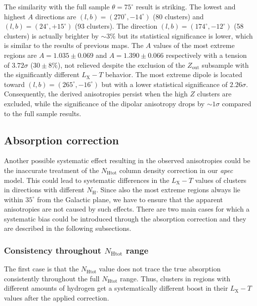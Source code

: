 \documentclass{aa}   %
\begin{document}
The similarity with the full sample $\theta=75^{\circ}$ result is striking. The lowest and highest $A$ directions are $(l,b)=(270^{\circ}, -14^{\circ})$ (80 clusters) and $(l,b)=(24^{\circ}, +15^{\circ})$ (93 clusters). The direction $(l,b)=(174^{\circ}, -12^{\circ})$ (58 clusters) is actually brighter by $\sim3\%$ but its statistical significance is lower, which is similar to the results of previous maps. The $A$ values of the most extreme regions are $A=1.035\pm 0.069$ and $A=1.390\pm 0.066$ respectively with a tension of $3.72\sigma$ ($30\pm 8\%$), not relieved despite the exclusion of the $Z_{\text{out}}$ subsample with the significantly different $L_{\text{X}}-T$ behavior. The most extreme dipole is located toward $(l,b)=(265^{\circ}, -16^{\circ})$ but with a lower statistical significance of $2.26\sigma$. Consequently, the derived anisotropies persist when the high $Z$ clusters are excluded, while the significance of the dipolar anisotropy drops by $\sim 1\sigma$ compared to the full sample results.

\subsection{Absorption correction} \label{galaxy_H}

Another possible systematic effect resulting in the observed anisotropies could be the inaccurate treatment of the $N_{\text{Htot}}$ column density correction in our \textit{apec} model. This could lead to systematic differences in the $L_{\text{X}}-T$ values of clusters in directions with different $N_{\text{H}}$. Since also the most extreme regions always lie within $35^{\circ}$ from the Galactic plane, we have to ensure that the apparent anisotropies are not caused by such effects. There are two main cases for which a systematic bias could be introduced through the absorption correction and they are described in the following subsections. 

\subsubsection{Consistency throughout $N_{\text{Htot}}$ range}\label{nh_range_cons}

The first case is that the $N_{\text{Htot}}$ value does not trace the true absorption consistently throughout the full $N_{\text{Htot}}$ range. Thus, clusters in regions with different amounts of hydrogen get a systematically different boost in their $L_{\text{X}}-T$ values after the applied correction. 
\end{document}
